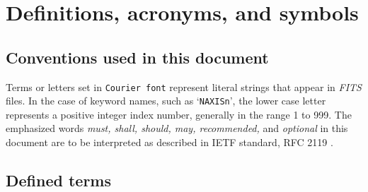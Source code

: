 \documentclass[onecolumn]{aa}
\begin{document}
\section{Definitions, acronyms, and symbols}
\label{s:def}

\subsection{Conventions used in this document}

Terms or letters set in {\tt Courier font} represent literal strings 
that appear in {\em FITS\/} files.  In the case of keyword names, such as
`{\tt NAXISn}', the lower case letter represents a positive integer  index number,
generally in the range 1 to 999.
The emphasized words {\em must, shall, should, may, recommended,} and {\em optional} 
in this document are to be interpreted as 
described in IETF standard, RFC 2119 \citep{rfc2119}.

\subsection{Defined terms}
\end{document}
